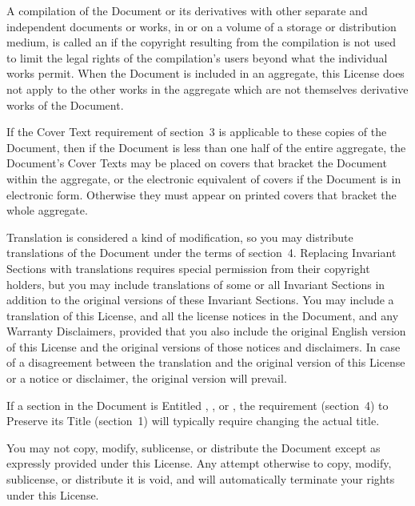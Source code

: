 A compilation of the Document or its derivatives with other separate
and independent documents or works, in or on a volume of a storage or
distribution medium, is called an  if the copyright
resulting from the compilation is not used to limit the legal rights
of the compilation's users beyond what the individual works permit.
When the Document is included in an aggregate, this License does not
apply to the other works in the aggregate which are not themselves
derivative works of the Document.

If the Cover Text requirement of section~3 is applicable to these
copies of the Document, then if the Document is less than one half of
the entire aggregate, the Document's Cover Texts may be placed on
covers that bracket the Document within the aggregate, or the
electronic equivalent of covers if the Document is in electronic form.
Otherwise they must appear on printed covers that bracket the whole
aggregate.


\stopalignment


Translation is considered a kind of modification, so you may
distribute translations of the Document under the terms of section~4.
Replacing Invariant Sections with translations requires special
permission from their copyright holders, but you may include
translations of some or all Invariant Sections in addition to the
original versions of these Invariant Sections.  You may include a
translation of this License, and all the license notices in the
Document, and any Warranty Disclaimers, provided that you also include
the original English version of this License and the original versions
of those notices and disclaimers.  In case of a disagreement between
the translation and the original version of this License or a notice
or disclaimer, the original version will prevail.

If a section in the Document is Entitled ,
, or , the requirement (section~4) to Preserve
its Title (section~1) will typically require changing the actual
title.


\stopalignment


You may not copy, modify, sublicense, or distribute the Document
except as expressly provided under this License.  Any attempt
otherwise to copy, modify, sublicense, or distribute it is void, and
will automatically terminate your rights under this License.

